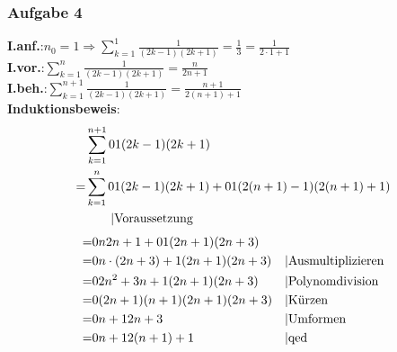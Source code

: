 \subsubsection{Aufgabe 4}
\textbf{I.anf.}:\quad $n_0 = 1 \Rightarrow \sum^1_{k=1} \frac{1}{(2k-1)(2k+1)} = \frac{1}{3}= \frac{1}{2\cdot1+1}$\\
\textbf{I.vor.}:\quad$\sum^n_{k=1} \frac{1}{(2k-1)(2k+1)} = \frac{n}{2n + 1}$ \\
\textbf{I.beh.}:\quad$\sum^{n+1}_{k=1} \frac{1}{(2k-1)(2k+1)} = \frac{n+1}{2(n+1) + 1} $\\
\textbf{Induktionsbeweis}: \begin{align*}
&\sum^{n+1}_{k=1} \frac{1}{(2k-1)(2k+1)}\\ 
= &\sum^n_{k=1} \frac{1}{(2k-1)(2k+1)} + \frac{1}{(2(n+1)-1)(2(n+1)+1)} \\
& \qquad\text{\textbar Voraussetzung}\end{align*}\begin{align*}
																				= &\frac{n}{2n + 1} + \frac{1}{(2n+1)(2n+3)} && \\
																				= &\frac{n \cdot (2n+3) + 1}{(2n+1)(2n+3)} 		&& \text{\textbar Ausmultiplizieren}\\
																				= &\frac{2n^2 + 3n + 1}{(2n+1)(2n+3)} 				&& \text{\textbar Polynomdivision}\\
																				= &\frac{(2n+1)(n+1)}{(2n+1)(2n+3)} 					&& \text{\textbar Kürzen}\\
																				= &\frac{n+1}{2n+3}														&& \text{\textbar Umformen}\\
																				= &\frac{n+1}{2(n+1) + 1} 										&& \text{\textbar qed}
\end{align*}
